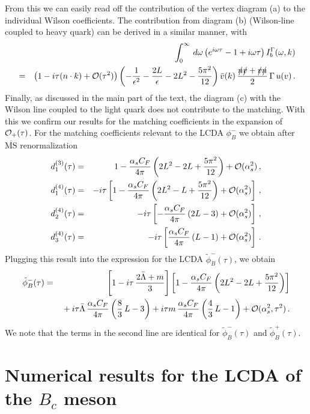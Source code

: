 \documentclass[a4paper,11pt]{article}
\begin{document}
From this we can easily read off the contribution of the vertex diagram (a) to the individual Wilson coefficients.
%
The contribution from diagram (b) (Wilson-line coupled to heavy quark) can be derived in a similar manner, with
\begin{eqnarray} 
&& \int_0^\infty \, d\omega \left(e^{i\omega \tau} - 1 + i \omega\tau  \right) I_b^\Gamma(\omega,k) 
\cr 
  &=&  \left(1 -i\tau (n \cdot k) + {\cal O}(\tau^2) \right)
	\left( -\frac{1}{\epsilon^2}
	- \frac{2L}{\epsilon}
	- 2 L^2 - \frac{5\pi^2}{12} \right) 
	\bar v(k) \, \frac{ \slashed n \slashed v + \slashed v \slashed n}{2} \, \Gamma \, u(v) \,. 
\end{eqnarray}
Finally, as discussed in the main part of the text, the diagram (c) with the Wilson line coupled to the light quark does not contribute to the matching. With this we confirm our results for the matching coefficients in the expansion of 
${\cal O}_+(\tau)$.
For the matching coefficients relevant to the LCDA $\phi_B^-$ we obtain after $\overline{\mathrm{MS}}$ renormalization
\begin{eqnarray}
	d_1^{(3)}(\tau) &=& 1 -\frac{\alpha_s C_F}{4\pi} 
	\left( 2 L^2-2 L + \frac{5\pi^2}{12}\right) + {\cal O}(\alpha_s^2) \,, \cr 
	d_1^{(4)}(\tau) &=& -i\tau \left[ 1 - \frac{\alpha_s C_F}{4\pi} \left( 2 L^2-L + \frac{5\pi^2}{12} \right)  + {\cal O}(\alpha_s^2) \right]  \,, \cr 
	d_{2}^{(4)}(\tau) &=& -i\tau \left[ - \frac{\alpha_s C_F}{4\pi} \left( 2L-3 \right) + {\cal O}(\alpha_s^2)\right]  \,, \cr 
    d_{3}^{(4)}(\tau) &=& -i \tau \left[ \frac{\alpha_s C_F}{4\pi} \left( L -1 \right) + {\cal O}(\alpha_s^2) \right] \,.
    \label{eq:d34minus}
\end{eqnarray}
Plugging this result into the expression for the LCDA $\tilde\phi_B^-(\tau)$,
we obtain
%
\begin{eqnarray}
    \tilde\phi_B^-(\tau) &=& 
    \left[1- i \tau \, \frac{2 \bar\Lambda  + m }{3} \right]\left[  1 - \frac{\alpha_s C_F}{4\pi} \left( 2 L^2 - 2 L + \frac{5\pi^2}{12} \right) \right]
    \cr 
    && {} + i \tau \bar\Lambda \, \frac{\alpha_s C_F}{4\pi} \left( \frac83  \, L - 3
 \right) 
      + i \tau m \, \frac{\alpha_s C_F}{4\pi} \left( \frac{4}{3}\, L - 1 \right)  + {\cal O}(\alpha_s^2,\tau^2) \,.
    \label{phitauexp2}
\end{eqnarray}
We note that the terms in the second line are identical for $\tilde\phi_B^-(\tau)$ and $\tilde\phi_B^+(\tau)$.


\section{Numerical results for the LCDA of the \texorpdfstring{$B_c$}{Bc} meson}
\end{document}
